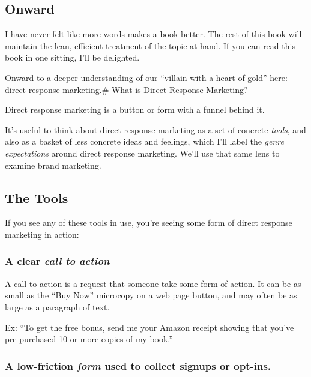\documentclass[13pt,]{tufte-handout}
\begin{document}
\hypertarget{onward}{%
\subsection{Onward}\label{onward}}

I have never felt like more words makes a book better. The rest of this
book will maintain the lean, efficient treatment of the topic at hand.
If you can read this book in one sitting, I'll be delighted.

Onward to a deeper understanding of our ``villain with a heart of gold''
here: direct response marketing.\# What is Direct Response Marketing?

Direct response marketing is a button or form with a funnel behind it.

It's useful to think about direct response marketing as a set of
concrete \emph{tools}, and also as a basket of less concrete ideas and
feelings, which I'll label the \emph{genre expectations} around direct
response marketing. We'll use that same lens to examine brand marketing.

\hypertarget{the-tools}{%
\subsection{The Tools}\label{the-tools}}

If you see any of these tools in use, you're seeing some form of direct
response marketing in action:

\hypertarget{a-clear-call-to-action}{%
\subsubsection{\texorpdfstring{A clear \emph{call to
action}}{A clear call to action}}\label{a-clear-call-to-action}}

A call to action is a request that someone take some form of action. It
can be as small as the ``Buy Now'' microcopy on a web page button, and
may often be as large as a paragraph of text.

Ex: ``To get the free bonus, send me your Amazon receipt showing that
you've pre-purchased 10 or more copies of my book.''

\hypertarget{a-low-friction-form-used-to-collect-signups-or-opt-ins.}{%
\subsubsection{\texorpdfstring{A low-friction \emph{form} used to
collect signups or
opt-ins.}{A low-friction form used to collect signups or opt-ins.}}\label{a-low-friction-form-used-to-collect-signups-or-opt-ins.}}
\end{document}
